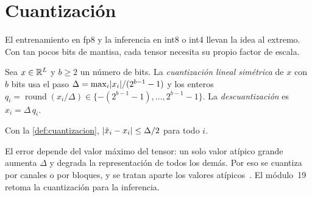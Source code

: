\section{Cuantización}

El entrenamiento en fp8 y la inferencia en int8 o int4 llevan la idea al extremo. Con tan pocos bits de mantisa, cada tensor necesita su propio factor de escala.

\begin{definicion}\label{def:cuantizacion}
Sea $x\in\mathbb{R}^{L}$ y $b\ge 2$ un número de bits. La \emph{cuantización lineal simétrica} de $x$ con $b$ bits usa el paso $\Delta=\max_i\lvert x_i\rvert/(2^{b-1}-1)$ y los enteros $q_i=\operatorname{round}(x_i/\Delta)\in\{-(2^{b-1}-1),\dots,2^{b-1}-1\}$. La \emph{descuantización} es $\hat x_i=\Delta\,q_i$.
\end{definicion}

\begin{proposicion}\label{prop:cuantizacion}
Con la \cref{def:cuantizacion}, $\lvert\hat x_i-x_i\rvert\le\Delta/2$ para todo $i$.
\end{proposicion}

El error depende del valor máximo del tensor: un solo valor atípico grande aumenta $\Delta$ y degrada la representación de todos los demás. Por eso se cuantiza por canales o por bloques, y se tratan aparte los valores atípicos~\cite{mit65940}. El módulo~19 retoma la cuantización para la inferencia.

